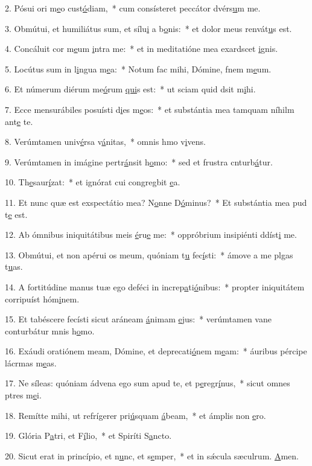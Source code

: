 2. Pósui ori m\uline{e}o cust\uline{ó}diam,~* cum consísteret peccátor dvérs\uline{u}m me.\par 
3. Obmútui, et humiliátus sum, et sílu\uline{i} a b\uline{o}nis:~* et dolor meus renvát\uline{u}s est.\par 
4. Concáluit cor m\uline{e}um \uline{i}ntra me:~* et in meditatióne mea exardscet \uline{i}gnis.\par 
5. Locútus sum in l\uline{i}ngua m\uline{e}a:~* Notum fac mihi, Dómine, fnem m\uline{e}um.\par 
6. Et númerum diérum me\uline{ó}rum \uline{qui}s est:~* ut sciam quid dsit m\uline{i}hi.\par 
7. Ecce mensurábiles posuísti d\uline{i}es m\uline{e}os:~* et substántia mea tamquam níhilm ant\uline{e} te.\par 
8. Verúmtamen univ\uline{é}rsa v\uline{á}nitas,~* omnis hmo v\uline{i}vens.\par 
9. Verúmtamen in imágine pertr\uline{á}nsit h\uline{o}mo:~* sed et frustra cnturb\uline{á}tur.\par 
10. Th\uline{e}saur\uline{í}zat:~* et ignórat cui congregbit \uline{e}a.\par 
11. Et nunc quæ est exspectátio mea? N\uline{o}nne D\uline{ó}minus?~* Et substántia mea pud t\uline{e} est.\par 
12. Ab ómnibus iniquitátibus meis \uline{é}ru\uline{e} me:~* oppróbrium insipiénti ddíst\uline{i} me.\par 
13. Obmútui, et non apérui os meum, quóniam t\uline{u} fec\uline{í}sti:~* ámove a me plgas t\uline{u}as.\par 
14. A fortitúdine manus tuæ ego deféci in increp\uline{a}ti\uline{ó}nibus:~* propter iniquitátem corripuíst hóm\uline{i}nem.\par 
15. Et tabéscere fecísti sicut aráneam \uline{á}nimam \uline{e}jus:~* verúmtamen vane conturbátur mnis h\uline{o}mo.\par 
16. Exáudi oratiónem meam, Dómine, et deprecati\uline{ó}nem m\uline{e}am:~* áuribus pércipe lácrmas m\uline{e}as.\par 
17. Ne síleas: quóniam ádvena ego sum apud te, et p\uline{e}regr\uline{í}nus,~* sicut omnes ptres m\uline{e}i.\par 
18. Remítte mihi, ut refrígerer pri\uline{ú}squam \uline{á}beam,~* et ámplis non \uline{e}ro.\par 
19. Glória P\uline{a}tri, et F\uline{í}lio,~* et Spiríti S\uline{a}ncto.\par 
20. Sicut erat in princípio, et n\uline{u}nc, et s\uline{e}mper,~* et in sǽcula sæculrum. \uline{A}men.\par 
